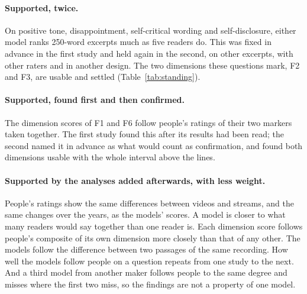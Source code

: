 \paragraph{Supported, twice.} On positive tone, disappointment, self-critical wording and self-disclosure, either
model ranks 250-word excerpts much as five readers do. This was fixed in advance in the first study and held
again in the second, on other excerpts, with other raters and in another design. The two dimensions these
questions mark, F2 and F3, are usable and settled (Table~\ref{tab:standing}).

\paragraph{Supported, found first and then confirmed.} The dimension scores of F1 and F6 follow people's ratings
of their two markers taken together. The first study found this after its results had been read; the second
named it in advance as what would count as confirmation, and found both dimensions usable with the whole
interval above the lines.

\paragraph{Supported by the analyses added afterwards, with less weight.} People's ratings show the same
differences between videos and streams, and the same changes over the years, as the models' scores. A model is
closer to what many readers would say together than one reader is. Each dimension score follows people's
composite of its own dimension more closely than that of any other. The models follow the difference between
two passages of the same recording. How well the models follow people on a question repeats from one study
to the next. And a third model from another maker follows people to the same degree and misses where the first
two miss, so the findings are not a property of one model.

